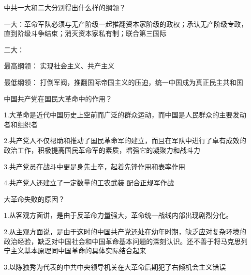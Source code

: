\documentclass[lang=cn,10pt]{elegantbook}
\begin{document}
	\begin{example}
		中共一大和二大分别得出什么样的纲领？
	\end{example}
	\begin{solution}
		
		一大：革命军队必须与无产阶级一起推翻资本家阶级的政权；承认无产阶级专政，直到阶级斗争结束；消灭资本家私有制；联合第三国际
		
		二大：
		
		最高纲领：
		实现社会主义、共产主义
		
		最低纲领：
		打倒军阀，推翻国际帝国主义的压迫，统一中国成为真正民主共和国
	\end{solution}
	\begin{example}
		中国共产党在国民大革命中的作用？
	\end{example}
	\begin{solution}
		
		1.大革命是近代中国历史上空前而广泛的群众运动，而中国是人民群众的主要发动者和组织者
		
		2.共产党人不仅帮助和推动了国民革命军的建立，而且在军队中进行了卓有成效的政治工作，积极提高国民革命军的素质，增强它的凝聚力和战斗力
		
		3.共产党员在战斗中更是身先士卒，起着先锋作用和表率作用
		
		4.共产党人还建立了一定数量的工农武装 配合正规军作战
	\end{solution}
	\begin{example}
		大革命失败的原因？
	\end{example}
	\begin{solution}
		
		1.从客观方面讲，是由于反革命力量强大，革命统一战线内部出现剧烈分化。
		
		2.从主观方面说，是由于这时的中国共产党还处在幼年时期，缺乏应对复杂环境的政治经验，缺乏对中国社会和中国革命基本问题的深刻认识。还不善于将马克思列宁主义基本原理同中国革命的具体实际结合起来
		
		3.以陈独秀为代表的中共中央领导机关在大革命后期犯了右倾机会主义错误
	\end{solution}
\end{document}
